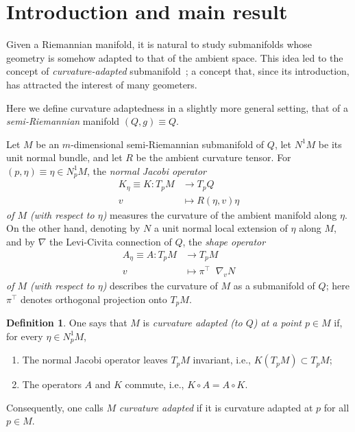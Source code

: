 \documentclass[a4paper,12pt,oneside]{amsart}
\newcommand{\grad}{\mathop{}\!\nabla}
\theoremstyle{plain}
\theoremstyle{remark}
\theoremstyle{definition}
\newtheorem{definition}[theorem]{Definition}
\begin{document}
\tableofcontents

\section{Introduction and main result} \label{IntroductionMainResult}
Given a Riemannian manifold, it is natural to study submanifolds whose geometry is somehow adapted to that of the ambient space. This idea led to the concept of \emph{curvature-adapted} submanifold~\cite{datri1979, berndt1991, berndt1992-2}; a concept that, since its introduction, has attracted the interest of many geometers.

Here we define curvature adaptedness in a slightly more general setting, that of a \emph{semi-Riemannian} manifold $(Q,g)\equiv Q$.

Let $M$ be an $m$-dimensional semi-Riemannian submanifold of $Q$, let $N^{1}M$ be its unit normal bundle, and let $R$ be the ambient curvature tensor. For $(p,\eta)\equiv \eta  \in N^{1}_{p}M$, the \textit{normal Jacobi operator}
\begin{align*}
K_{\eta} \equiv K \colon T_{p}M &\to T_{p}Q \\
v &\mapsto R(\eta,v)\eta
\end{align*}
\textit{of $M$ \textup{(}with respect to $\eta$\textup{)}} measures the curvature of the ambient manifold along $\eta$. On the other hand, denoting by $N$ a unit normal local extension of $\eta$ along $M$, and by $\nabla$ the Levi-Civita connection of $Q$, the \textit{shape operator}
\begin{align*}
A_{\eta} \equiv A \colon T_{p}M &\to T_{p}M \\
v &\mapsto \pi^{\top} \grad_{v}N
\end{align*}
\textit{of $M$ \textup{(}with respect to $\eta$\textup{)}} describes the curvature of $M$ as a submanifold of $Q$; here $\pi^{\top}$ denotes orthogonal projection onto $T_{p}M$.

\begin{definition}\label{curvatureAdaptednessDEF}
One says that $M$ is \textit{curvature adapted \textup{(}to $Q$\textup{)} at a point $p\in M$} if, for every $\eta \in N^{1}_{p}M$,
\begin{enumerate}[label=(\arabic*)]
\item \label{cond1} The normal Jacobi operator leaves $T_{p}M$ invariant, i.e., $K(T_{p}M) \subset T_{p}M$;
\item \label{cond2} The operators $A$ and $K$ commute, i.e., $K \circ A = A \circ K$.
\end{enumerate}

Consequently, one calls $M$ \textit{curvature adapted} if it is curvature adapted at $p$ for all $p \in M$.
\end{definition}
\end{document}
